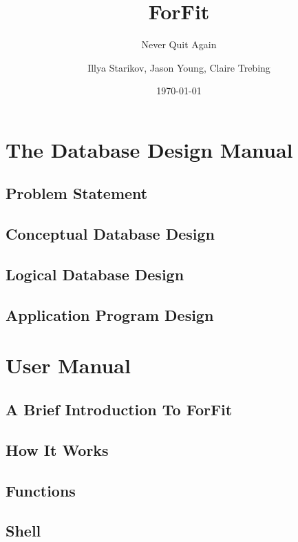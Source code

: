 \documentclass[oneside]{scrbook}
\title{ForFit}
\subtitle{Never Quit Again}
\author{Illya Starikov, Jason Young, Claire Trebing}
\date{\today}
\begin{document}
\maketitle
\tableofcontents

\part{The Database Design Manual}
\chapter{Problem Statement}


\chapter{Conceptual Database Design}


\chapter{Logical Database Design}


\chapter{Application Program Design}


\part{User Manual}
\chapter{A Brief Introduction To ForFit}


\chapter{How It Works}


\chapter{Functions}







\chapter{Shell}




\end{document}
